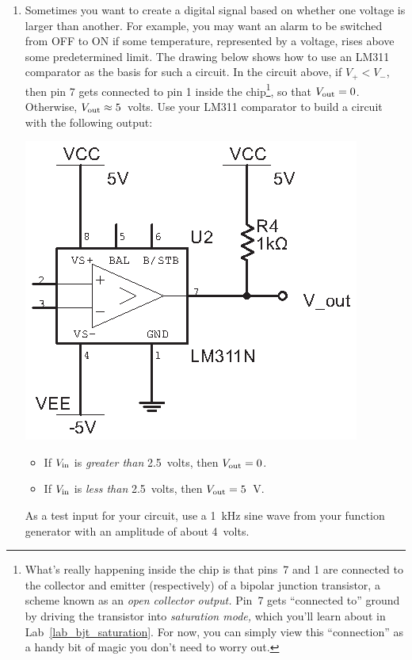 \begin{enumerate}[wide]

\item \label{part_comparator} Sometimes you want to create a digital signal based on whether one voltage is larger than another.  For example, you may want an alarm to be switched from OFF to ON if some temperature, represented by a voltage, rises above some predetermined limit. The drawing below shows how to use an LM311 comparator as the basis for such a circuit.  
In the circuit above, if $V_+<V_-$, then pin 7 gets connected to pin 1 inside the chip\footnote{What's really happening inside the chip is that pins~7 and 1 are connected to the collector and emitter (respectively) of a bipolar junction transistor, a scheme known as an \textit{open collector output.}  Pin~7 gets ``connected to'' ground by driving the transistor into \textit{saturation mode,} which you'll learn about in Lab~\ref{lab_bjt_saturation}.  For now, you can simply view this ``connection'' as a handy bit of magic you don't need to worry out.}, so that $V_{\rm out}=0$.  Otherwise, $V_{\rm out} \approx 5$~volts.  Use your LM311 comparator to build a circuit with the following output: 
\begin{center}
\includegraphics{digital_electronics/basic_lm311.eps}
\end{center}


\begin{itemize}[nosep]
\item If $V_{\rm in}$ is \textit{greater than} 2.5~volts, then $V_{\rm out}=0$.
\item If $V_{\rm in}$ is \textit{less than} 2.5~volts, then $V_{\rm out}=5$~V.
\end{itemize}
As a test input for your circuit, use a 1~kHz sine wave from your function generator with an amplitude of about 4~volts.



\end{enumerate}
